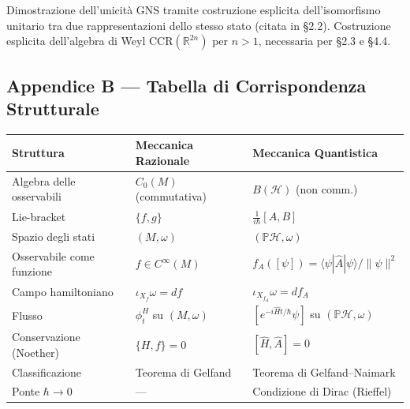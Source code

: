 \documentclass[12pt, a4paper]{article}
\begin{document}
	Dimostrazione dell'unicità GNS tramite costruzione esplicita dell'isomorfismo unitario
	tra due rappresentazioni dello stesso stato (citata in \S2.2). Costruzione esplicita
	dell'algebra di Weyl $\mathrm{CCR}(\mathbb{R}^{2n})$ per $n>1$, necessaria per \S2.3
	e \S4.4.
	
	\subsection*{Appendice B --- Tabella di Corrispondenza Strutturale}
	
	\begin{center}
		\renewcommand{\arraystretch}{1.35}
		\begin{tabular}{lll}
			\hline
			\textbf{Struttura} & \textbf{Meccanica Razionale} & \textbf{Meccanica Quantistica} \\
			\hline
			Algebra delle osservabili & $C_0(M)$ (commutativa) & $B(\mathcal{H})$ (non comm.) \\
			Lie-bracket & $\{f,g\}$ & $\tfrac{1}{i\hbar}[A,B]$ \\
			Spazio degli stati & $(M,\omega)$ & $(\mathbb{P}\mathcal{H},\omega)$ \\
			Osservabile come funzione & $f\in C^\infty(M)$ &
			$f_A([\psi])=\langle\psi|\hat A|\psi\rangle/\|\psi\|^2$ \\
			Campo hamiltoniano & $\iota_{X_f}\omega=df$ & $\iota_{X_{f_A}}\omega=df_A$ \\
			Flusso & $\phi_t^H$ su $(M,\omega)$ &
			$[e^{-i\hat Ht/\hbar}\psi]$ su $(\mathbb{P}\mathcal{H},\omega)$ \\
			Conservazione (Noether) & $\{H,f\}=0$ & $[\hat H,\hat A]=0$ \\
			Classificazione & Teorema di Gelfand & Teorema di Gelfand--Naimark \\
			Ponte $\hbar\to 0$ & --- & Condizione di Dirac (Rieffel) \\
			\hline
		\end{tabular}
	\end{center}
	
\end{document}
